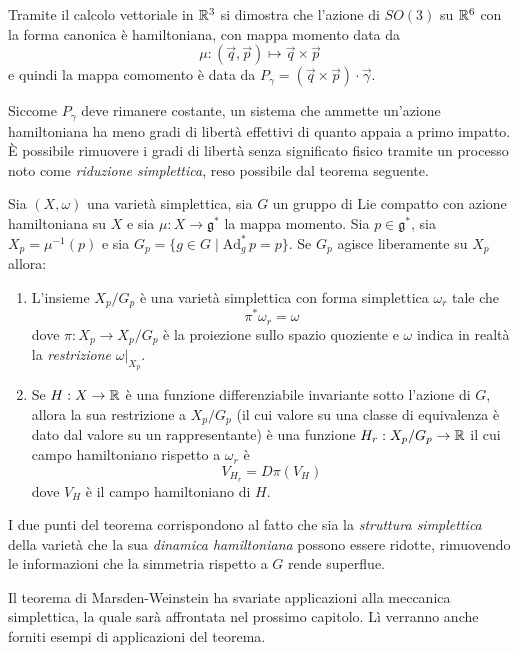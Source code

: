 Tramite il calcolo vettoriale in $\mathbb{R}^3$ si dimostra che l'azione di $SO(3)$ su $\mathbb{R}^6$ con la forma canonica è hamiltoniana, con mappa momento data da 
\begin{equation*}
\mu: (\vec{q},\vec{p}) \mapsto \vec{q} \times \vec{p}
\end{equation*} 
e quindi la mappa comomento è data da $P_{\gamma}=(\vec{q} \times \vec{p}) \cdot  \vec{\gamma}$.

Siccome $P_\gamma$ deve rimanere costante, un sistema che ammette un'azione hamiltoniana ha meno gradi di libertà effettivi di quanto appaia a primo impatto. È possibile rimuovere i gradi di libertà senza significato fisico tramite un processo noto come \emph{riduzione simplettica}, reso possibile dal teorema seguente.

\begin{theorem}
  Sia $(X,\omega)$ una varietà simplettica, sia $G$ un gruppo di Lie compatto con azione hamiltoniana su $X$ e sia $\mu:  X \to \mathfrak{g}^*$ la mappa momento. Sia $p \in \mathfrak{g}^*$, sia $X_p = \mu^{-1}(p)$ e sia $G_p = \{g \in G \mid \mathrm{Ad}_g^*\, p = p\}$. Se $G_p$ agisce liberamente su $X_p$ allora:
  \begin{enumerate}
    \item L'insieme $X_p/G_p$ è una varietà simplettica con forma simplettica $\omega_r$ tale che \begin{equation*}
    \pi^* \omega_r = \omega
    \end{equation*} 
    dove $\pi:X_p \to X_p/G_p$ è la proiezione sullo spazio quoziente e $\omega$ indica in realtà la \emph{restrizione} $\omega|_{X_p}$.
    \item Se $H:X\to \mathbb{R}$ è una funzione differenziabile invariante sotto l'azione di $G$, allora la sua restrizione a $X_p/G_p$ (il cui valore su una classe di equivalenza è dato dal valore su un rappresentante) è una funzione $H_r:X_p/G_p \to \mathbb{R}$ il cui campo hamiltoniano rispetto a $\omega_r$ è \begin{equation*}
    V_{H_r} = D \pi(V_H)
    \end{equation*}
    dove $V_H$ è il campo hamiltoniano di $H$.
  \end{enumerate}
\end{theorem}
\begin{remark}
  I due punti del teorema corrispondono al fatto che sia la \emph{struttura simplettica} della varietà che la sua \emph{dinamica hamiltoniana} possono essere ridotte, rimuovendo le informazioni che la simmetria rispetto a $G$ rende superflue.
\end{remark}

Il teorema di Marsden-Weinstein ha svariate applicazioni alla meccanica simplettica, la quale sarà affrontata nel prossimo capitolo. Lì verranno anche forniti esempi di applicazioni del teorema.